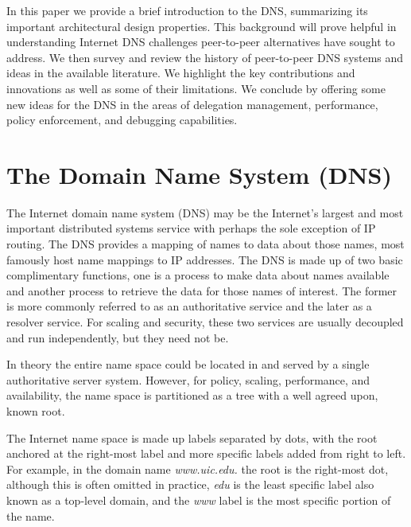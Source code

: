 \documentclass[sigconf]{acmart}
\begin{document}
In this paper we provide a brief introduction to the DNS, summarizing
its important architectural design properties.  This background will
prove helpful in understanding Internet DNS challenges peer-to-peer
alternatives have sought to address.  We then survey and review the
history of peer-to-peer DNS systems and ideas in the available
literature.  We highlight the key contributions and innovations as well
as some of their limitations.  We conclude by offering some new ideas
for the DNS in the areas of delegation management, performance, policy
enforcement, and debugging capabilities.

\section{The Domain Name System (DNS)}

The Internet domain name system (DNS) may be the Internet's largest
and most important distributed systems service with perhaps the sole
exception of IP
routing.\cite{mockapetris_domain_1987}\cite{mockapetris_domain_1987-1}
The DNS provides a mapping of names to data about those names, most
famously host name mappings to IP addresses.  The DNS is made up of two
basic complimentary functions, one is a process to make data about
names available and another process to retrieve the data for those names
of interest.  The former is more commonly referred to as an
authoritative service and the later as a resolver service.  For scaling
and security, these two services are usually decoupled and run
independently, but they need not be.

In theory the entire name space could be located in and served by a
single authoritative server system.  However, for policy, scaling,
performance, and availability, the name space is partitioned as a tree
with a well agreed upon, known root.

The Internet name space is made up labels separated by dots, with the
root anchored at the right-most label and more specific labels added
from right to left.  For example, in the domain name \emph{www.uic.edu.}
the root is the right-most dot, although this is often omitted in
practice, \emph{edu} is the least specific label also known as a
top-level domain, and the \emph{www} label is the most specific portion
of the name.
\end{document}
